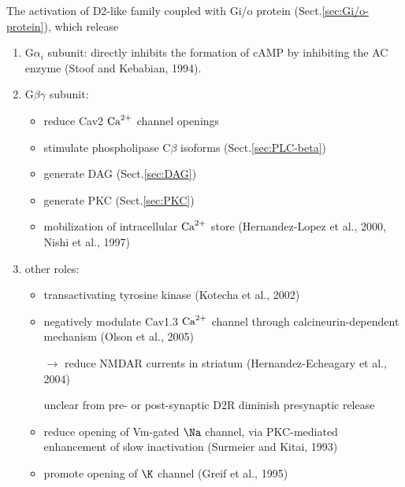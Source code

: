 The activation of D2-like family coupled with Gi/o protein
(Sect.\ref{sec:Gi/o-protein}), which release  
\begin{enumerate}

  \item G$\alpha_i$ subunit: directly inhibits the formation of cAMP by
  inhibiting the AC enzyme (Stoof and Kebabian, 1994).

  \item G$\beta\gamma$ subunit: 
  \begin{itemize}
    \item reduce Cav2 ${\text{Ca}^{2+}}$ channel openings 
    
    \item stimulate phospholipase 	C$\beta$ isoforms (Sect.\ref{sec:PLC-beta})
    \item generate DAG (Sect.\ref{sec:DAG})
    \item generate PKC (Sect.\ref{sec:PKC})
    \item mobilization of intracellular ${\text{Ca}^{2+}}$ store (Hernandez-Lopez et al.,
    2000, Nishi et al., 1997)
  \end{itemize} 

  \item other roles:
  \begin{itemize}
     \item transactivating tyrosine kinase (Kotecha et al., 2002)
     
     \item negatively modulate Cav1.3 ${\text{Ca}^{2+}}$ channel through calcineurin-dependent
    mechanism (Olson et al., 2005)
    
     $\rightarrow$ reduce NMDAR currents
    in striatum (Hernandez-Echeagary et al., 2004)
    
    \item [unclear from pre- or post-synaptic D2R] diminish presynaptic release
    
    \item reduce opening of Vm-gated $\Na$ channel, via PKC-mediated enhancement
    of slow inactivation (Surmeier and Kitai, 1993)
    \item promote opening of $\K$ channel (Greif et al., 1995)
  \end{itemize}
\end{enumerate}

